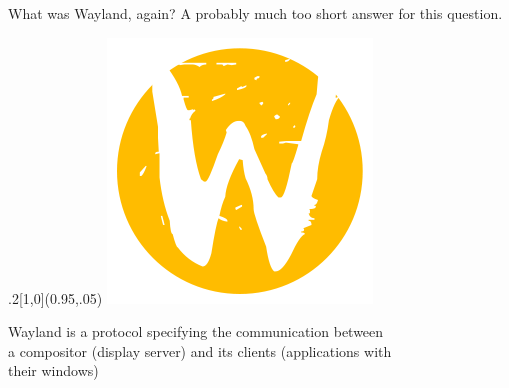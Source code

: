 \documentclass[ucs,9pt]{beamer}
\begin{document}
\begin{frame}
    {What was Wayland, again?}
    {A probably much too short answer for this question.}

    \begin{textblock*}{.2\paperwidth}[1,0](0.95\paperwidth,.05\paperheight)%
        \includegraphics[width=\linewidth]{wayland.png}
    \end{textblock*}%

    Wayland is a protocol specifying the communication between\\
    a compositor (display server) and its clients (applications with\\
    their windows)


\end{frame}
\end{document}
